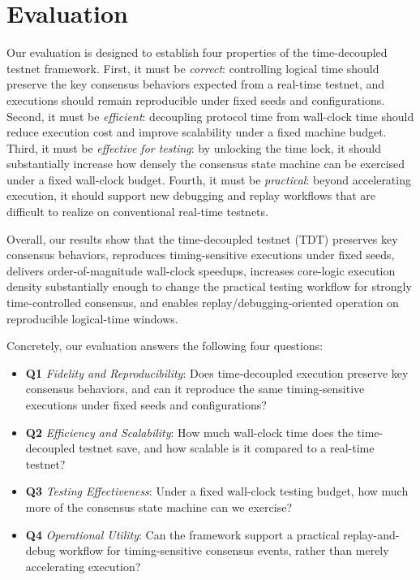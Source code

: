 



\section{Evaluation}
\label{sec:evaluation_methodology}

Our evaluation is designed to establish four properties of the time-decoupled testnet framework. First, it must be \emph{correct}: controlling logical time should preserve the key consensus behaviors expected from a real-time testnet, and executions should remain reproducible under fixed seeds and configurations. Second, it must be \emph{efficient}: decoupling protocol time from wall-clock time should reduce execution cost and improve scalability under a fixed machine budget. Third, it must be \emph{effective for testing}: by unlocking the time lock, it should substantially increase how densely the consensus state machine can be exercised under a fixed wall-clock budget. Fourth, it must be \emph{practical}: beyond accelerating execution, it should support new debugging and replay workflows that are difficult to realize on conventional real-time testnets.

Overall, our results show that the time-decoupled testnet (TDT) preserves key consensus behaviors, reproduces timing-sensitive executions under fixed seeds, delivers order-of-magnitude wall-clock speedups, increases core-logic execution density substantially enough to change the practical testing workflow for strongly time-controlled consensus, and enables replay/debugging-oriented operation on reproducible logical-time windows.

Concretely, our evaluation answers the following four questions:
\begin{itemize}
    \item \textbf{Q1} \emph{Fidelity and Reproducibility}: Does time-decoupled execution preserve key consensus behaviors, and can it reproduce the same timing-sensitive executions under fixed seeds and configurations?
    \item \textbf{Q2} \emph{Efficiency and Scalability}: How much wall-clock time does the time-decoupled testnet save, and how scalable is it compared to a real-time testnet?
    \item \textbf{Q3} \emph{Testing Effectiveness}: Under a fixed wall-clock testing budget, how much more of the consensus state machine can we exercise?
    \item \textbf{Q4} \emph{Operational Utility}: Can the framework support a practical replay-and-debug workflow for timing-sensitive consensus events, rather than merely accelerating execution?
\end{itemize}

